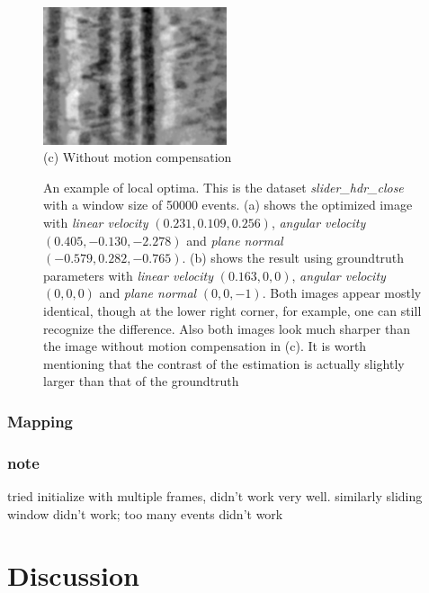 \begin{figure}
  \begin{minipage}[t]{\textwidth}
    \centering \includegraphics[width =
    0.48\textwidth]{images/slider_zero_motion.jpg}
    \label{subfig:estimation}
    \\(c) Without motion compensation
  \end{minipage}
  \hfill

  \caption{An example of local optima. This is the dataset
    \textit{slider\_hdr\_close} with a window size of 50000
    events. (a) shows the optimized image with \textit{linear
      velocity} $( 0.231, 0.109, 0.256)$, \textit{angular velocity}
    $(0.405, -0.130, -2.278)$ and \textit{plane normal}
    $(-0.579, 0.282, -0.765)$. (b) shows the result using groundtruth
    parameters with \textit{linear velocity} $(0.163, 0, 0)$,
    \textit{angular velocity} $(0, 0, 0)$ and \textit{plane normal}
    $(0, 0, -1)$. Both images appear mostly identical, though at the
    lower right corner, for example, one can still recognize the
    difference. Also both images look much sharper than the image
    without motion compensation in (c). It is worth mentioning that
    the contrast of the estimation is actually slightly larger than
    that of the groundtruth}
  \label{fig:local_optimum}
\end{figure}

\subsection{Mapping}
\label{sec:keyframe2map}


\subsection{note}
\label{sec:note}

tried initialize with multiple frames, didn't work very
well. similarly sliding window didn't work; too many events didn't
work

\chapter{Discussion}
\label{chap:discussion}




